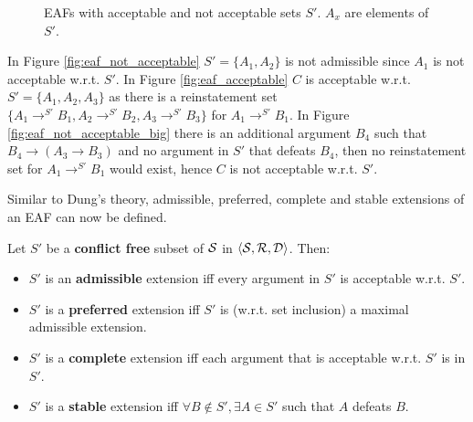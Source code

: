 \begin{figure}[htb]
{
		\label{fig:eaf_not_acceptable_big}
	}
	\caption{\glspl{EAF} with acceptable and not acceptable sets $S'$. $A_x$ are elements of $S'$.}
\end{figure}

\begin{exa}
	In Figure \autoref{fig:eaf_not_acceptable} $S'=\{A_1, A_2\}$ is not admissible since $A_1$ is not acceptable w.r.t. $S'$. In Figure \autoref{fig:eaf_acceptable} $C$ is acceptable w.r.t. $S' = \{A_1, A_2, A_3\}$ as there is a reinstatement set $\{A_1 \rightarrow^{S'} B_1, A_2 \rightarrow^{S'} B_2, A_3 \rightarrow^{S'} B_3\}$ for $A_1 \rightarrow^{S'} B_1$. In Figure \autoref{fig:eaf_not_acceptable_big} there is an additional argument $B_4$ such that $B_4 \rightarrow (A_3 \rightarrow B_3)$ and no argument in $S'$ that defeats $B_4$, then no reinstatement set for $A_1 \rightarrow^{S'} B_1$ would exist, hence $C$ is not acceptable w.r.t. $S'$.
\end{exa}

Similar to Dung's theory, admissible, preferred, complete and stable extensions of an \gls{EAF} can now be defined.


\begin{definition}
	Let $S'$ be a \textbf{conflict free} subset of $\S$ in $\langle \S, \R, \D \rangle$. Then:
	\begin{itemize}
		\item $S'$ is an \textbf{admissible} extension iff every argument in $S'$ is acceptable w.r.t. $S'$.
		\item $S'$ is a \textbf{preferred} extension iff $S'$ is (w.r.t. set inclusion) a maximal admissible extension.
		\item $S'$ is a \textbf{complete} extension iff each argument that is acceptable w.r.t. $S'$ is in $S'$.
		\item $S'$ is a \textbf{stable} extension iff $\forall B \notin S', \exists A \in S'$ such that $A$ defeats $B$.
	\end{itemize}
\end{definition}


